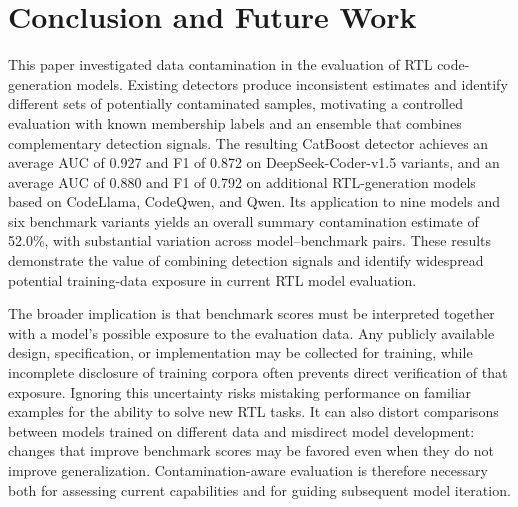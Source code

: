 \section{Conclusion and Future Work}
\label{sec:conclusion}

This paper investigated data contamination in the evaluation of RTL code-generation models. Existing detectors produce inconsistent estimates and identify different sets of potentially contaminated samples, motivating a controlled evaluation with known membership labels and an ensemble that combines complementary detection signals. The resulting CatBoost detector achieves an average AUC of 0.927 and F1 of 0.872 on DeepSeek-Coder-v1.5 variants, and an average AUC of 0.880 and F1 of 0.792 on additional RTL-generation models based on CodeLlama, CodeQwen, and Qwen. Its application to nine models and six benchmark variants yields an overall summary contamination estimate of 52.0\%, with substantial variation across model--benchmark pairs. These results demonstrate the value of combining detection signals and identify widespread potential training-data exposure in current RTL model evaluation.

The broader implication is that benchmark scores must be interpreted together with a model's possible exposure to the evaluation data. Any publicly available design, specification, or implementation may be collected for training, while incomplete disclosure of training corpora often prevents direct verification of that exposure. Ignoring this uncertainty risks mistaking performance on familiar examples for the ability to solve new RTL tasks. It can also distort comparisons between models trained on different data and misdirect model development: changes that improve benchmark scores may be favored even when they do not improve generalization. Contamination-aware evaluation is therefore necessary both for assessing current capabilities and for guiding subsequent model iteration.


